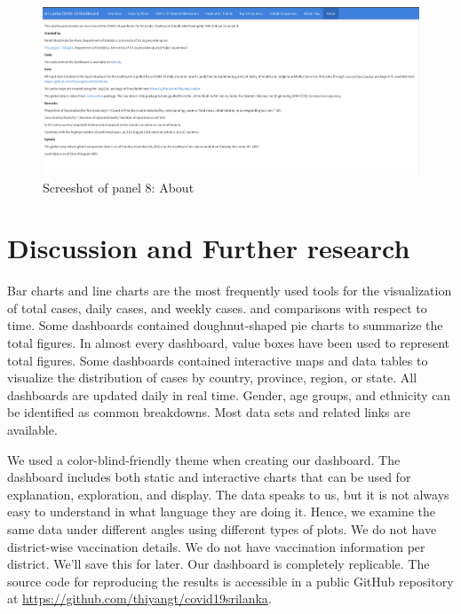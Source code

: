 \documentclass[
]{article}
\begin{document}
\begin{figure}

{\centering \includegraphics[width=0.8\linewidth]{Images/image8} 

}

\caption{Screeshot of panel 8: About}\label{fig:unnamed-chunk-12}
\end{figure}

\newpage

\hypertarget{conclusions}{%
\section{Discussion and Further research}\label{conclusions}}

Bar charts and line charts are the most frequently used tools for the
visualization of total cases, daily cases, and weekly cases. and
comparisons with respect to time. Some dashboards contained
doughnut-shaped pie charts to summarize the total figures. In almost
every dashboard, value boxes have been used to represent total figures.
Some dashboards contained interactive maps and data tables to visualize
the distribution of cases by country, province, region, or state. All
dashboards are updated daily in real time. Gender, age groups, and
ethnicity can be identified as common breakdowns. Most data sets and
related links are available.

We used a color-blind-friendly theme when creating our dashboard. The
dashboard includes both static and interactive charts that can be used
for explanation, exploration, and display. The data speaks to us, but it
is not always easy to understand in what language they are doing it.
Hence, we examine the same data under different angles using different
types of plots. We do not have district-wise vaccination details. We do
not have vaccination information per district. We'll save this for
later. Our dashboard is completely replicable. The source code for
reproducing the results is accessible in a public GitHub repository at
\url{https://github.com/thiyangt/covid19srilanka}.
\end{document}
